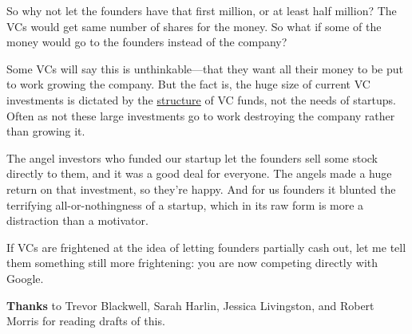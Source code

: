 So why not let the founders have that first million, or at least half
million? The VCs would get same number of shares for the money. So what
if some of the money would go to the founders instead of the company?

Some VCs will say this is unthinkable---that they want all their money
to be put to work growing the company. But the fact is, the huge size of
current VC investments is dictated by the
\href{venturecapital.html}{structure} of VC funds, not the needs of
startups. Often as not these large investments go to work destroying the
company rather than growing it.

The angel investors who funded our startup let the founders sell some
stock directly to them, and it was a good deal for everyone. The angels
made a huge return on that investment, so they're happy. And for us
founders it blunted the terrifying all-or-nothingness of a startup,
which in its raw form is more a distraction than a motivator.

If VCs are frightened at the idea of letting founders partially cash
out, let me tell them something still more frightening: you are now
competing directly with Google.

\textbf{Thanks} to Trevor Blackwell, Sarah Harlin, Jessica Livingston,
and Robert Morris for reading drafts of this.

